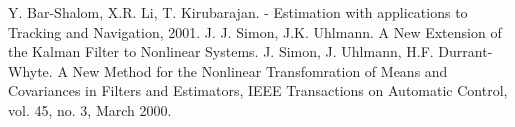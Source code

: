 \begin{thebibliography}{1}
	 Y. Bar-Shalom, X.R. Li, T. Kirubarajan. - Estimation with applications to Tracking and Navigation, 2001.
	 J. J. Simon, J.K. Uhlmann. A New Extension of the Kalman Filter to Nonlinear Systems.
	 J. Simon, J. Uhlmann, H.F. Durrant-Whyte. A New Method for the Nonlinear Transfomration of Means and Covariances in Filters and Estimators,
		IEEE Transactions on Automatic Control, vol. 45, no. 3, March 2000.
\end{thebibliography}